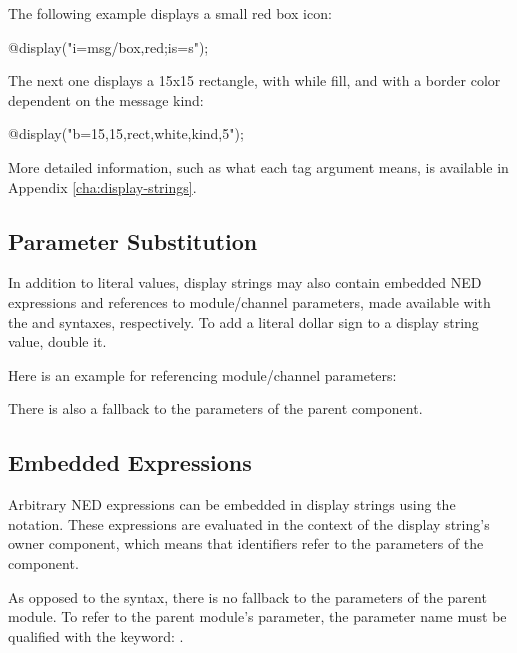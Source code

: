 The following example displays a small red box icon:

\begin{ned}
@display("i=msg/box,red;is=s");
\end{ned}

The next one displays a 15x15 rectangle, with while fill, and with a border
color dependent on the message kind:

\begin{ned}
@display("b=15,15,rect,white,kind,5");
\end{ned}

More detailed information, such as what each tag argument means, is
available in Appendix \ref{cha:display-strings}.


\subsection{Parameter Substitution}
\label{sec:graphics:displaystring-parameter-substitution}

In addition to literal values, display strings may also contain embedded NED
expressions and references to module/channel parameters, made available with the
 and  syntaxes, respectively. To add a literal
dollar sign to a display string value, double it.

Here is an example for referencing module/channel parameters:


There is also a fallback to the parameters of the parent component.

\subsection{Embedded Expressions}
\label{sec:graphics:displaystring-embedded-expressions}

Arbitrary NED expressions can be embedded in display strings using the
 notation. These expressions are evaluated in the context of the
display string's owner component, which means that identifiers refer to the
parameters of the component.

As opposed to the  syntax, there is no fallback to the parameters of
the parent module. To refer to the parent module's  parameter, the
parameter name must be qualified with the  keyword:
.

